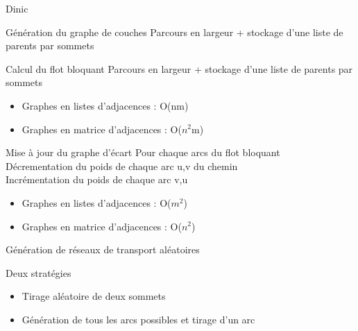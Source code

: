 \begin{frame}{Dinic}
	\begin{block}{Génération du graphe de couches}
  	Parcours en largeur + stockage d'une liste de parents par sommets
  \end{block}
  \begin{block}{Calcul du flot bloquant}
  	Parcours en largeur + stockage d'une liste de parents par sommets
  	\begin{itemize}
    	\item Graphes en listes d'adjacences : O(nm)
  	  \item Graphes en matrice d'adjacences : O($n^2$m)
  	\end{itemize}
  \end{block}
	\begin{block}{Mise à jour du graphe d'écart}
  	Pour chaque arcs du flot bloquant \\
  	Décrementation du poids de chaque arc u,v du chemin \\
  	Incrémentation du poids de chaque arc v,u \\
  	\begin{itemize}
    	\item Graphes en listes d'adjacences : O($m^2$)
  	  \item Graphes en matrice d'adjacences : O($n^2$)
  	\end{itemize}
  \end{block}
\end{frame}

\begin{frame}{Génération de réseaux de transport aléatoires}
	\begin{block}{Deux stratégies}
  	\begin{itemize}
  		\item Tirage aléatoire de deux sommets
  		\item Génération de tous les arcs possibles et tirage d'un arc
  	\end{itemize}
	\end{block}
\end{frame}
